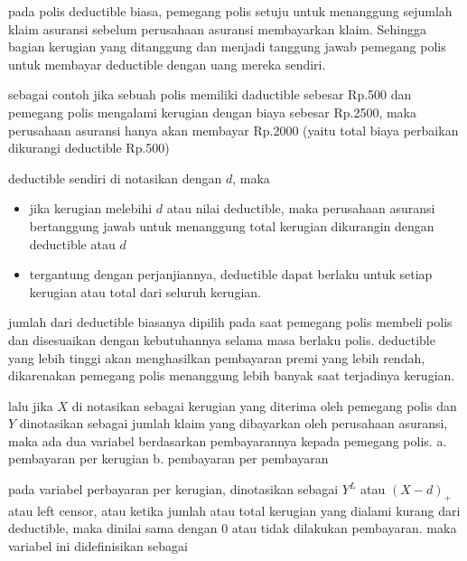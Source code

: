 \documentclass[
]{book}
\begin{document}
pada polis deductible biasa, pemegang polis setuju untuk menanggung sejumlah klaim asuransi sebelum perusahaan asuransi membayarkan klaim. Sehingga bagian kerugian yang ditanggung dan menjadi tanggung jawab pemegang polis untuk membayar deductible dengan uang mereka sendiri.

sebagai contoh jika sebuah polis memiliki daductible sebesar Rp.500 dan pemegang polis mengalami kerugian dengan biaya sebesar Rp.2500, maka perusahaan asuransi hanya akan membayar Rp.2000 (yaitu total biaya perbaikan dikurangi deductible Rp.500)

deductible sendiri di notasikan dengan \(d\), maka

\begin{itemize}
\item
  jika kerugian melebihi \(d\) atau nilai deductible, maka perusahaan asuransi bertanggung jawab untuk menanggung total kerugian dikurangin dengan deductible atau \(d\)
\item
  tergantung dengan perjanjiannya, deductible dapat berlaku untuk setiap kerugian atau total dari seluruh kerugian.
\end{itemize}

jumlah dari deductible biasanya dipilih pada saat pemegang polis membeli polis dan disesuaikan dengan kebutuhannya selama masa berlaku polis. deductible yang lebih tinggi akan menghasilkan pembayaran premi yang lebih rendah, dikarenakan pemegang polis menanggung lebih banyak saat terjadinya kerugian.

lalu jika \(X\) di notasikan sebagai kerugian yang diterima oleh pemegang polis dan \(Y\) dinotasikan sebagai jumlah klaim yang dibayarkan oleh perusahaan asuransi, maka ada dua variabel berdasarkan pembayarannya kepada pemegang polis.
a. pembayaran per kerugian
b. pembayaran per pembayaran

pada variabel perbayaran per kerugian, dinotasikan sebagai \(Y^L\) atau \((X-d)_+\) atau left censor, atau ketika jumlah atau total kerugian yang dialami kurang dari deductible, maka dinilai sama dengan 0 atau tidak dilakukan pembayaran. maka variabel ini didefinisikan sebagai
\end{document}
